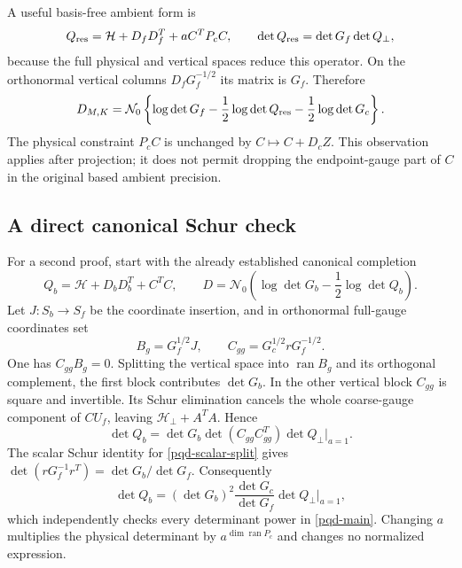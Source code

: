 \documentclass[11pt]{article}
\theoremstyle{remark}
\begin{document}
A useful basis-free ambient form is
\begin{equation}
 Q_{\rm res}=\mathcal H+D_fD_f^T+aC^TP_cC,
 \qquad \det Q_{\rm res}=\det G_f\det Q_\perp,
 \label{pqd-ambient}
\end{equation}
because the full physical and vertical spaces reduce this operator.
On the orthonormal vertical columns $D_fG_f^{-1/2}$ its matrix is
$G_f$. Therefore
\begin{equation}
 D_{M,K}=\mathcal N_0\left\{
 \log\det G_f-\frac12\log\det Q_{\rm res}
                                      -\frac12\log\det G_c\right\}.
 \label{pqd-ambient-identity}
\end{equation}
The physical constraint $P_cC$ is unchanged by $C\mapsto C+D_cZ$.
This observation applies after projection; it does not permit dropping
the endpoint-gauge part of $C$ in the original based ambient precision.

\subsection{A direct canonical Schur check}
\label{pqd-schur-section}

For a second proof, start with the already established canonical
completion
\begin{equation}
 Q_b=\mathcal H+D_bD_b^T+C^TC,\qquad
 D=\mathcal N_0\left(\log\det G_b-\frac12\log\det Q_b\right).
 \label{pqd-canonical}
\end{equation}
Let $J:S_b\to S_f$ be the coordinate insertion, and in orthonormal
full-gauge coordinates set
\begin{equation}
 B_g=G_f^{1/2}J,\qquad C_{gg}=G_c^{1/2}rG_f^{-1/2}.
 \label{pqd-gauge-blocks}
\end{equation}
One has $C_{gg}B_g=0$. Splitting the vertical space into
$\operatorname{ran}B_g$ and its orthogonal complement, the first block
contributes $\det G_b$. In the other vertical block $C_{gg}$ is square
and invertible. Its Schur elimination cancels the whole coarse-gauge
component of $CU_f$, leaving $\mathcal H_\perp+A^TA$. Hence
\begin{equation}
 \det Q_b=\det G_b\det(C_{gg}C_{gg}^T)\det Q_\perp\big|_{a=1}.
 \label{pqd-schur1}
\end{equation}
The scalar Schur identity for \eqref{pqd-scalar-split} gives
$\det(rG_f^{-1}r^T)=\det G_b/\det G_f$. Consequently
\begin{equation}
 \det Q_b=(\det G_b)^2\frac{\det G_c}{\det G_f}
                                      \det Q_\perp\big|_{a=1},
 \label{pqd-schur2}
\end{equation}
which independently checks every determinant power in
\eqref{pqd-main}. Changing $a$ multiplies the physical determinant by
$a^{\dim\operatorname{ran}P_c}$ and changes no normalized expression.
\end{document}
